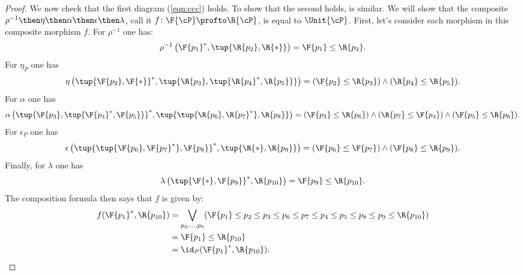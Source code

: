 \begin{proof}
We now check that the first diagram (\cref{eqn:ccc}) holds. To show that the second holds, is similar. We will show that the composite $\rho^{-1}\then \eta\then \alpha \then \epsilon\then \lambda$, call it $f\colon \F{\cP} \profto \R{\cP} $, is equal to $\Unit{\cP }$. First, let's consider each morphism in this composite morphism $f$. For $\rho^{-1}$ one has:
\begin{equation}
	\rho^{-1}\left(\F{p_1}^*,\tup{\R{p_2},\R{*}}\right)=\F{p_1}\leq \R{p_2}.
\end{equation}
For $\eta_P$ one has
\begin{equation}
    	\eta\left(\tup{\F{p_2},\F{*}}^*,\tup{\R{p_3},\tup{\R{p_4}^*,\R{p_5}}}\right)=(\F{p_2}\leq \R{p_3})\wedge(\R{p_4}\leq \R{p_5}).
\end{equation}
For $\alpha$ one has
\begin{equation}
    \alpha\left( \tup{\F{p_3},\tup{\F{p_4}^*,\F{p_5}}}^*,\tup{\tup{\R{p_6},\R{p_7}^*},\R{p_8}}\right)=(\F{p_3}\leq \R{p_6})\wedge(\R{p_7}\leq \F{p_4})\wedge(\F{p_5}\leq \R{p_8}).
\end{equation}
For $\epsilon_P$ one has
\begin{equation}
    \epsilon\left(\tup{\tup{\F{p_6},\F{p_7}^*},\F{p_8}}^*,\tup{\R{*},\R{p_9}}\right)=(\F{p_6}\leq \F{p_7})\wedge (\F{p_8}\leq \R{p_9}).
\end{equation}
Finally, for $\lambda$ one has
\begin{equation}
    \lambda\left(\tup{\F{*},\F{p_9}}^*,\R{p_{10}}\right)=\F{p_9}\leq \R{p_{10}}.
\end{equation}
The composition formula then says that $f$ is given by:
\begin{equation}
    \begin{aligned}
    f(\F{p_1}^*,\R{p_{10}})&=\bigvee_{p_2,\ldots,p_9} (\F{p_1}\leq p_2\leq p_3\leq p_6\leq p_7\leq p_4\leq p_5\leq p_8\leq p_9\leq \R{p_{10}})\\
    &=\F{p_1}\leq \R{p_{10}}\\
    &=\id_P(\F{p_1}^*,\R{p_{10}}).
    \end{aligned}
\end{equation}
\end{proof}

